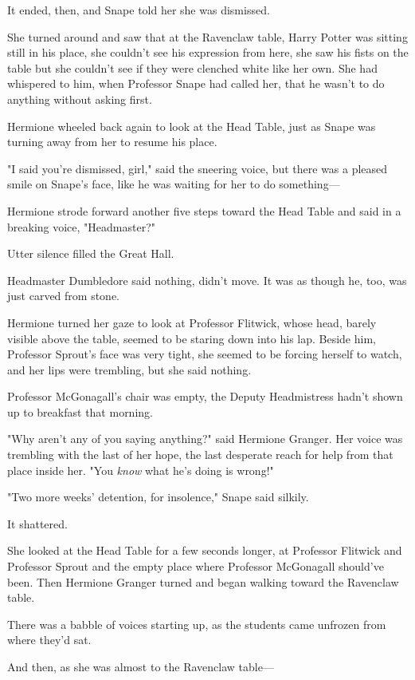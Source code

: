 It ended, then, and Snape told her she was dismissed.

She turned around and saw that at the Ravenclaw table, Harry Potter was sitting
still in his place, she couldn't see his expression from here, she saw his
fists on the table but she couldn't see if they were clenched white like her
own. She had whispered to him, when Professor Snape had called her, that he
wasn't to do anything without asking first.

Hermione wheeled back again to look at the Head Table, just as Snape was
turning away from her to resume his place.

"I said you're dismissed, girl," said the sneering voice, but there was a
pleased smile on Snape's face, like he was waiting for her to do something—

Hermione strode forward another five steps toward the Head Table and said in a
breaking voice, "Headmaster?"

Utter silence filled the Great Hall.

Headmaster Dumbledore said nothing, didn't move. It was as though he, too, was
just carved from stone.

Hermione turned her gaze to look at Professor Flitwick, whose head, barely
visible above the table, seemed to be staring down into his lap. Beside him,
Professor Sprout's face was very tight, she seemed to be forcing herself to
watch, and her lips were trembling, but she said nothing.

Professor McGonagall's chair was empty, the Deputy Headmistress hadn't shown up
to breakfast that morning.

"Why aren't any of you saying anything?" said Hermione Granger. Her voice was
trembling with the last of her hope, the last desperate reach for help from
that place inside her. "You \emph{know} what he's doing is wrong!"

"Two more weeks' detention, for insolence," Snape said silkily.

It shattered.

She looked at the Head Table for a few seconds longer, at Professor Flitwick
and Professor Sprout and the empty place where Professor McGonagall should've
been. Then Hermione Granger turned and began walking toward the Ravenclaw table.

There was a babble of voices starting up, as the students came unfrozen from
where they'd sat.

And then, as she was almost to the Ravenclaw table—


